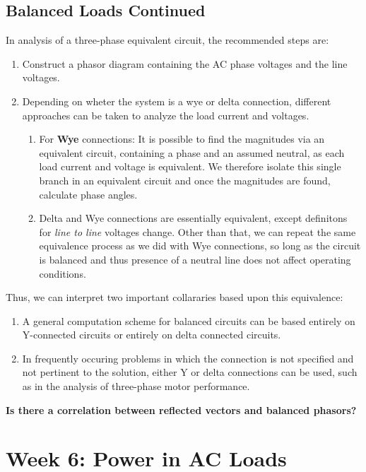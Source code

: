 \documentclass{book}
\begin{document}
\subsection{Balanced Loads Continued}

In analysis of a three-phase equivalent circuit, the recommended steps are:

\begin{enumerate}
	\item Construct a phasor diagram containing the AC phase voltages and the line voltages.
	\item Depending on wheter the system is a wye or delta connection, different approaches can be taken to analyze the load current and voltages. 
	\begin{enumerate}
		\item For \textbf{Wye} connections: It is possible to find the magnitudes via an equivalent circuit, containing a phase and an assumed neutral, as each load current and voltage is equivalent. We therefore isolate this single branch in an equivalent circuit and once the magnitudes are found, calculate phase angles.
		\item  Delta and Wye connections are essentially equivalent, except definitons for \textit{line to line} voltages change. Other than that, we can repeat the same equivalence process as we did with Wye connections, so long as the circuit is balanced and thus presence of a neutral line does not affect operating conditions. 
	\end{enumerate}
\end{enumerate}

Thus, we can interpret two important collararies based upon this equivalence:

\begin{enumerate}
	\item A general computation scheme for balanced circuits can be based entirely on Y-connected circuits or entirely on delta connected circuits.
	\item In frequently occuring problems in which the connection is not specified and not pertinent to the solution, either Y or delta connections can be used, such as in the analysis of three-phase motor performance.
\end{enumerate}

\textbf{Is there a correlation between reflected vectors and balanced phasors?}
	

\section{Week 6: Power in AC Loads}
\end{document}
